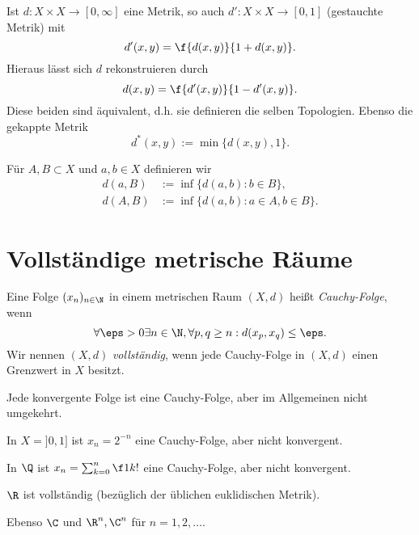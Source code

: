 \begin{ex}
	Ist $d: X \times X \to [0,\infty]$ eine Metrik, so auch $d': X \times X \to [0,1]$ (gestauchte Metrik) mit
	\[
		d'(x,y) = \f {d(x,y)}{1 + d(x,y)}.
	\]
	Hieraus lässt sich $d$ rekonstruieren durch
	\[
		d(x,y) = \f {d'(x,y)}{1-d'(x,y)}.
	\]
	Diese beiden sind äquivalent, d.h. sie definieren die selben Topologien.
	Ebenso die gekappte Metrik
	\[
		d^*(x,y) := \min \{d(x,y), 1 \}.
	\]
\end{ex}


Für $A, B \subset X$ und $a,b \in X$ definieren wir
\begin{align*}
	d(a,B)
		&:= \inf \{ d(a,b) : b \in B \}, \\
	d(A,B)
		&:= \inf \{ d(a,b) : a \in A, b \in B \}.
\end{align*}


\section{Vollständige metrische Räume}


\begin{df}
	Eine Folge $(x_n)_{n\in \N}$ in einem metrischen Raum $(X,d)$ heißt \emph{Cauchy-Folge}, wenn
	\[
		\forall \eps > 0 \exists n \in \N, \forall p,q \ge n : d(x_p,x_q) \le \eps.
	\]
	Wir nennen $(X,d)$ \emph{vollständig}, wenn jede Cauchy-Folge in $(X,d)$ einen Grenzwert in $X$ besitzt.
\end{df}

\begin{nt}
	Jede konvergente Folge ist eine Cauchy-Folge, aber im Allgemeinen nicht umgekehrt.
\end{nt}

\begin{ex}
	In $X = ]0,1]$ ist $x_n = 2^{-n}$ eine Cauchy-Folge, aber nicht konvergent.

	In $\Q$ ist $x_n = \sum_{k=0}^n \f 1{k!}$ eine Cauchy-Folge, aber nicht konvergent.
\end{ex}

\begin{st}
	$\R$ ist vollständig (bezüglich der üblichen euklidischen Metrik).

	Ebenso $\C$ und $\R^n, \C^n$ für $n = 1, 2, \dotsc$.
\end{st}

